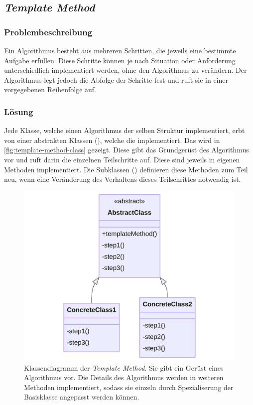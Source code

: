 \subsection{\emph{Template Method}}

\subsubsection*{Problembeschreibung}

Ein Algorithmus besteht aus mehreren Schritten, die jeweils eine bestimmte Aufgabe erfüllen. Diese Schritte können je nach Situation oder Anforderung unterschiedlich implementiert werden, ohne den Algorithmus zu verändern. Der Algorithmus legt jedoch die Abfolge der Schritte fest und ruft sie in einer vorgegebenen Reihenfolge auf. \cite{gamma_design_1995}

\subsubsection*{Lösung}

Jede Klasse, welche einen Algorithmus der selben Struktur implementiert, erbt von einer abstrakten Klassen (), welche die  implementiert. Das wird in \autoref{fig:template-method-class} gezeigt. Diese gibt das Grundgerüst des Algorithmus vor und ruft darin die einzelnen Teilschritte auf. Diese sind jeweils in eigenen Methoden implementiert. Die Subklassen () definieren diese Methoden zum Teil neu, wenn eine Veränderung des Verhaltens dieses Teilschrittes notwendig ist.

\begin{figure}[!ht]
	\centering
	\includegraphics[width=0.75\linewidth]{images/patterns/template-method-class.png}
	\caption{Klassendiagramm der \emph{Template Method}. Sie gibt ein Gerüst eines Algorithmus vor. Die Details des Algorithmus werden in weiteren Methoden implementiert, sodass sie einzeln durch Spezialiserung der Basisklasse angepasst werden können. \cite{skobeleva_template_2023}}
	\label{fig:template-method-class}
\end{figure}

